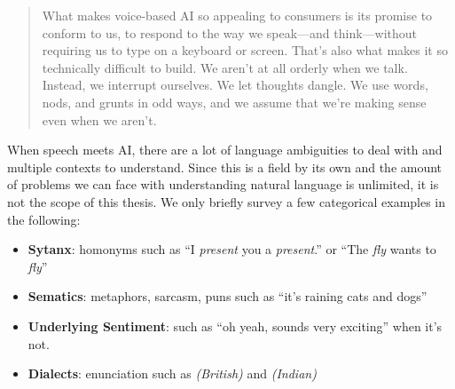 \begin{quotation}
What makes voice-based AI so appealing to consumers is its promise to conform to us, to respond to the way we speak—and think—without requiring us to type on a keyboard or screen. That’s also what makes it so technically difficult to build. We aren’t at all orderly when we talk. Instead, we interrupt ourselves. We let thoughts dangle. We use words, nods, and grunts in odd ways, and we assume that we’re making sense even when we aren’t. \cite{mit:Alexa}
\end{quotation}

When speech meets AI, there are a lot of language ambiguities to deal with and multiple contexts to understand. Since this is a field by its own and the amount of problems we can face with understanding natural language is unlimited, it is not the scope of this thesis. We only briefly survey a few categorical examples in the following:
\begin{itemize}
	\item \textbf{Sytanx}: homonyms such as ``I \textit{present} you a \textit{present}.'' or ``The \textit{fly} wants to \textit{fly}''
	
	\item \textbf{Sematics}: metaphors, sarcasm, puns such as ``it’s raining cats and dogs''
	
	\item \textbf{Underlying Sentiment}: such as ``oh yeah, sounds very exciting'' when it's not.
	
	\item \textbf{Dialects}: enunciation such as \textipa{[dI"vE|9pm9nt]} \textit{(British)} and \textipa{[d9v"|Apm9nt]} \textit{(Indian)}

\end{itemize}

%
%	
%


